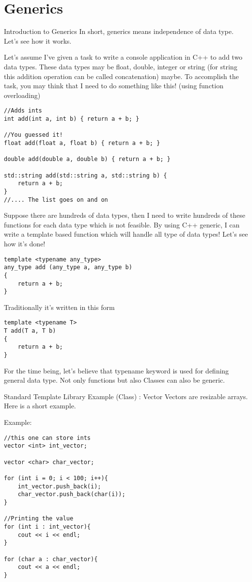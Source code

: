 \documentclass[newPxFont]{beamer}
\begin{document}
\section{Generics}



\begin{frame}{Introduction to Generics}
In short, generics means independence of data type. Let's see how it works.

Let's assume I've given a task to write a console application in C++ to add two data types. These data types may be float, double, integer or string (for string this addition operation can be called concatenation) maybe. To accomplish the task, you may think that I need to do something like this! (using function overloading)
\begin{verbatim}
//Adds ints
int add(int a, int b) { return a + b; }

//You guessed it!
float add(float a, float b) { return a + b; }

double add(double a, double b) { return a + b; }

std::string add(std::string a, std::string b) {
    return a + b; 
}
//.... The list goes on and on
\end{verbatim}

Suppose there are hundreds of data types, then I need to write hundreds of these functions for each data type which is not feasible. By using C++ generic, I can write a template based function which will handle all type of data types! Let's see how it's done!

\begin{verbatim}
template <typename any_type>
any_type add (any_type a, any_type b)
{
    return a + b;
}
\end{verbatim}

Traditionally it's written in this form

\begin{verbatim}
template <typename T>
T add(T a, T b)
{
    return a + b;
}
\end{verbatim}

For the time being, let's believe that \alert{typename} keyword is used for defining general data type. Not only functions but also \alert{Class}es can also be generic.

\begin{block}{Standard Template Library Example (Class) : Vector}
Vectors are resizable arrays. Here is a short example.
\end{block}

\alert{Example:}
\begin{verbatim}
//this one can store ints
vector <int> int_vector;

vector <char> char_vector;

for (int i = 0; i < 100; i++){
    int_vector.push_back(i);
    char_vector.push_back(char(i));
}

//Printing the value
for (int i : int_vector){
    cout << i << endl;
}

for (char a : char_vector){
    cout << a << endl;
}

\end{verbatim}
\end{frame}
\end{document}
